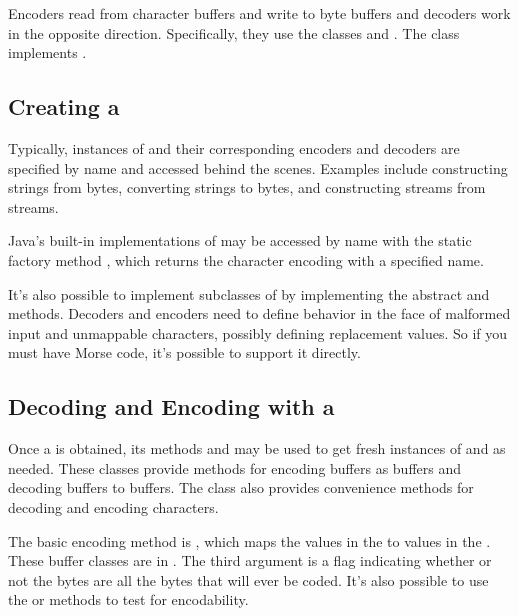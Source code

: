 Encoders read from character buffers and write to byte buffers and
decoders work in the opposite direction.  Specifically, they use the
 classes  and .  The
class  implements .

\subsection{Creating a }

Typically, instances of  and their corresponding
encoders and decoders are specified by name and accessed behind the
scenes.  Examples include constructing strings from bytes, converting
strings to bytes, and constructing  streams from
 streams.

Java's built-in implementations of  may be accessed by
name with the static factory method ,
which returns the character encoding with a specified name.  

It's also possible to implement subclasses of  by
implementing the abstract  and 
methods.  Decoders and encoders need to define behavior in the face of
malformed input and unmappable characters, possibly defining
replacement values. So if you must have Morse code, it's possible to
support it directly.  

\subsection{Decoding and Encoding with a }\label{section:charset-encoder}

Once a  is obtained, its methods  and
 may be used to get fresh instances of
 and  as needed. These classes
provide methods for encoding  buffers as 
buffers and decoding  buffers to  buffers.  The
 class also provides convenience methods for decoding
and encoding characters.

The basic encoding method is
, which maps the
 values in the  to  values in
the .  These buffer classes are in .
The third argument is a flag indicating whether or not the bytes are
all the bytes that will ever be coded.  It's also possible to use the
 or  methods to
test for encodability.  

